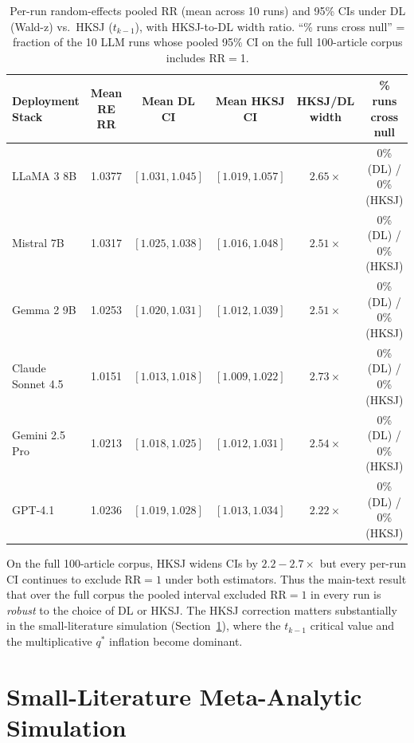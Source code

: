 \documentclass[11pt]{article}
\newenvironment{fittab}{\begin{lrbox}{\fittabbox}}{\end{lrbox}%
  \ifdim\wd\fittabbox>\linewidth\resizebox{\linewidth}{!}{\usebox{\fittabbox}}\else\usebox{\fittabbox}\fi}
\begin{document}
\begin{table}[htbp]
\centering
\caption{Per-run random-effects pooled RR (mean across 10 runs) and 95\% CIs under DL (Wald-z) vs.\ HKSJ ($t_{k{-}1}$), with HKSJ-to-DL width ratio. ``\% runs cross null'' = fraction of the 10 LLM runs whose pooled 95\% CI on the full 100-article corpus includes RR${=}$1.}
\label{tab:hksj_full}
\begin{fittab}\begin{tabular}{lccccc}
\toprule
\textbf{Deployment Stack} & \textbf{Mean RE RR} & \textbf{Mean DL CI} & \textbf{Mean HKSJ CI} & \textbf{HKSJ/DL width} & \textbf{\% runs cross null} \\
\midrule
LLaMA 3 8B        & 1.0377 & $[1.031, 1.045]$ & $[1.019, 1.057]$ & $2.65\times$ & 0\% (DL) / 0\% (HKSJ) \\
Mistral 7B        & 1.0317 & $[1.025, 1.038]$ & $[1.016, 1.048]$ & $2.51\times$ & 0\% (DL) / 0\% (HKSJ) \\
Gemma 2 9B        & 1.0253 & $[1.020, 1.031]$ & $[1.012, 1.039]$ & $2.51\times$ & 0\% (DL) / 0\% (HKSJ) \\
\midrule
Claude Sonnet 4.5 & 1.0151 & $[1.013, 1.018]$ & $[1.009, 1.022]$ & $2.73\times$ & 0\% (DL) / 0\% (HKSJ) \\
Gemini 2.5 Pro    & 1.0213 & $[1.018, 1.025]$ & $[1.012, 1.031]$ & $2.54\times$ & 0\% (DL) / 0\% (HKSJ) \\
GPT-4.1           & 1.0236 & $[1.019, 1.028]$ & $[1.013, 1.034]$ & $2.22\times$ & 0\% (DL) / 0\% (HKSJ) \\
\bottomrule
\end{tabular}\end{fittab}
\end{table}

\noindent On the full 100-article corpus, HKSJ widens CIs by $2.2{-}2.7{\times}$ but every per-run CI continues to exclude RR${=}1$ under both estimators. Thus the main-text result that over the full corpus the pooled interval excluded RR${=}1$ in every run is \emph{robust} to the choice of DL or HKSJ. The HKSJ correction matters substantially in the small-literature simulation (Section~\ref{sec:smalllit_supp}), where the $t_{k{-}1}$ critical value and the multiplicative $q^{\ast}$ inflation become dominant.

\section{Small-Literature Meta-Analytic Simulation}
\label{sec:smalllit_supp}
\end{document}
